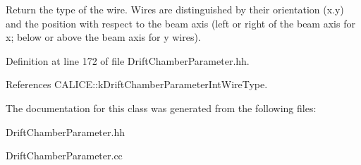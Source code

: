 Return the type of the wire. Wires are distinguished by their orientation (x.y) and the position with respect to the beam axis (left or right of the beam axis for x; below or above the beam axis for y wires). 

Definition at line 172 of file DriftChamberParameter.hh.

References CALICE::kDriftChamberParameterIntWireType.

The documentation for this class was generated from the following files:\begin{DoxyCompactItemize}
\item 
DriftChamberParameter.hh\item 
DriftChamberParameter.cc\end{DoxyCompactItemize}
